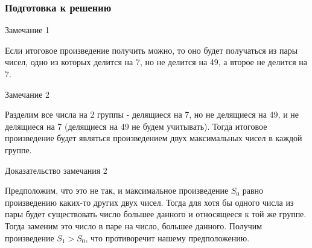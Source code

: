 \documentclass{beamer}
\begin{document}
\begin{frame}

    \frametitle{Подготовка к решению}

    {\footnotesize

    \begin{block}{Замечание 1}

        Если итоговое произведение получить можно, то оно будет получаться из пары чисел, одно из которых делится на 7, но не делится на 49, а второе не делится на 7.

    \end{block}

    \pause

    \begin{block}{Замечание 2}

        Разделим все числа на 2 группы - делящиеся на 7, но не делящиеся на 49, и не делящиеся на 7 (делящиеся на 49 не будем учитывать). Тогда итоговое произведение будет являться произведением двух максимальных чисел в каждой группе.

    \end{block}

    \pause

    \begin{alertblock}{Доказательство замечания 2}

        Предположим, что это не так, и максимальное произведение $S_0$ равно произведению каких-то других двух чисел. Тогда для хотя бы одного числа из пары будет существовать число большее данного и относящееся к той же группе. Тогда заменим это число в паре на число, большее данного. Получим произведение $S_1 > S_0$, что противоречит нашему предположению.

    \end{alertblock}

    }

\end{frame}
\end{document}
